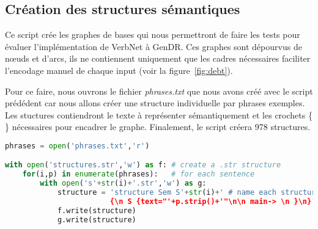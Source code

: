 \subsection{Création des structures sémantiques}\label{sec:pythonstruc}

Ce script crée les graphes de bases qui nous permettront de faire les tests pour évaluer l'implémentation de VerbNet à GenDR. Ces graphes sont dépourvus de n\oe{}uds et d'arcs, ils ne contiennent uniquement que les cadres nécessaires faciliter l'encodage manuel de chaque input (voir la figure~\ref{fig:debt}).

Pour ce faire, nous ouvrons le fichier \emph{phrases.txt} que nous avons créé avec le script prédédent car nous allons créer une structure individuelle par phrases exemples. Les stuctures contiendront le texte à représenter sémantiquement et les crochets \{ \} nécessaires pour encadrer le graphe. Finalement, le script créera 978 structures.

\begin{lstlisting}[language=Python, caption = Code pour créer les structures sémantiques vides, label=structurepython]
phrases = open('phrases.txt','r')

with open('structures.str','w') as f: # create a .str structure
    for(i,p) in enumerate(phrases):   # for each sentence
        with open('s'+str(i)+'.str','w') as g:
            structure = 'structure Sem S'+str(i)+' # name each structure by enumeration
						{\n S {text="'+p.strip()+'"\n\n main-> \n }\n}' # insert as texte the sentence
            f.write(structure)
            g.write(structure)
\end{lstlisting}

